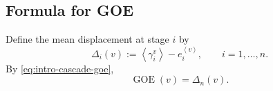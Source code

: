 \documentclass[onecolumn]{IEEEtran}
\newcommand{\GOE}{\operatorname{GOE}}
\newcommand{\avg}[1]{\left\langle #1\right\rangle}
\begin{document}

 
\subsection{Formula for GOE}
% 
Define the mean displacement at stage $i$ by
\begin{equation}
    \Delta_i(v)
    :=
    \avg{\gamma_i^v}-e_i^{\avg{ v}},
    \qquad i=1,\ldots,n.
    \label{eq:delta-def}
\end{equation}
By \eqref{eq:intro-cascade-goe},
\begin{equation}
    \GOE(v)=\Delta_n(v).
    \label{eq:goe-delta}
\end{equation}
\end{document}

